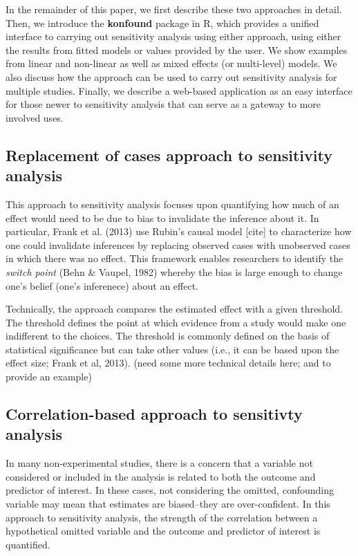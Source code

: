 \documentclass[man]{apa6}
\theoremstyle{definition}
\theoremstyle{definition}
\theoremstyle{definition}
\theoremstyle{remark}
\begin{document}
In the remainder of this paper, we first describe these two approaches
in detail. Then, we introduce the \textbf{konfound} package in R, which
provides a unified interface to carrying out sensitivity analysis using
either approach, using either the results from fitted models or values
provided by the user. We show examples from linear and non-linear as
well as mixed effects (or multi-level) models. We also discuss how the
approach can be used to carry out sensitivity analysis for multiple
studies. Finally, we describe a web-based application as an easy
interface for those newer to sensitivity analysis that can serve as a
gateway to more involved uses.

\subsection{Replacement of cases approach to sensitivity
analysis}\label{replacement-of-cases-approach-to-sensitivity-analysis}

This approach to sensitivity analysis focuses upon quantifying how much
of an effect would need to be due to bias to invalidate the inference
about it. In particular, Frank et al. (2013) use Rubin's causal model
{[}cite{]} to characterize how one could invalidate inferences by
replacing observed cases with unobserved cases in which there was no
effect. This framework enables researchers to identify the \emph{switch
point} (Behn \& Vaupel, 1982) whereby the bias is large enough to change
one's belief (one's inferenece) about an effect.

Technically, the approach compares the estimated effect with a given
threshold. The threshold defines the point at which evidence from a
study would make one indifferent to the choices. The threshold is
commonly defined on the basis of statistical significance but can take
other values (i.e., it can be based upon the effect size; Frank et al,
2013). (need some more technical details here; and to provide an
example)

\subsection{Correlation-based approach to sensitivty
analysis}\label{correlation-based-approach-to-sensitivty-analysis}

In many non-experimental studies, there is a concern that a variable not
considered or included in the analysis is related to both the outcome
and predictor of interest. In these cases, not considering the omitted,
confounding variable may mean that estimates are biased--they are
over-confident. In this approach to sensitivity analysis, the strength
of the correlation between a hypothetical omitted variable and the
outcome and predictor of interest is quantified.
\end{document}
